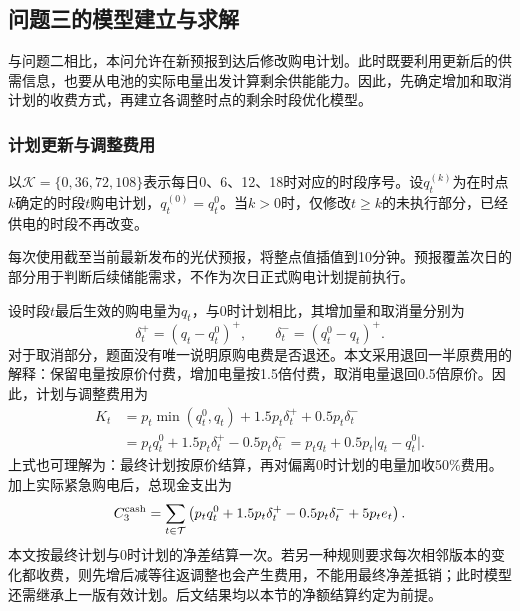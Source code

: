 

\subsection{问题三的模型建立与求解}
\label{sec:problem3}

与问题二相比，本问允许在新预报到达后修改购电计划。此时既要利用更新后的供需信息，也要从电池的实际电量出发计算剩余供能能力。因此，先确定增加和取消计划的收费方式，再建立各调整时点的剩余时段优化模型。

\subsubsection{计划更新与调整费用}

以$\mathcal K=\{0,36,72,108\}$表示每日0、6、12、18时对应的时段序号。设$q_t^{(k)}$为在时点$k$确定的时段$t$购电计划，$q_t^{(0)}=q_t^0$。当$k>0$时，仅修改$t\ge k$的未执行部分，已经供电的时段不再改变。

每次使用截至当前最新发布的光伏预报，将整点值插值到10分钟。预报覆盖次日的部分用于判断后续储能需求，不作为次日正式购电计划提前执行。

设时段$t$最后生效的购电量为$q_t$，与0时计划相比，其增加量和取消量分别为
\begin{equation}
  \delta_t^+=(q_t-q_t^0)^+,\qquad
  \delta_t^-=(q_t^0-q_t)^+.
  \label{eq:adjustment}
\end{equation}
对于取消部分，题面没有唯一说明原购电费是否退还。本文采用退回一半原费用的解释：保留电量按原价付费，增加电量按1.5倍付费，取消电量退回0.5倍原价。因此，计划与调整费用为
\begin{equation}
\begin{aligned}
  K_t&=p_t\min(q_t^0,q_t)+1.5p_t\delta_t^++0.5p_t\delta_t^-\\
     &=p_tq_t^0+1.5p_t\delta_t^+-0.5p_t\delta_t^-
      =p_tq_t+0.5p_t\lvert q_t-q_t^0\rvert.
\end{aligned}
  \label{eq:contract-cost}
\end{equation}
上式也可理解为：最终计划按原价结算，再对偏离0时计划的电量加收50\%费用。加上实际紧急购电后，总现金支出为
\begin{equation}
  C_3^{\rm cash}=\sum_{t\in\mathcal T}
  \left(p_tq_t^0+1.5p_t\delta_t^+-0.5p_t\delta_t^-+5p_te_t\right).
  \label{eq:problem3-cash}
\end{equation}
本文按最终计划与0时计划的净差结算一次。若另一种规则要求每次相邻版本的变化都收费，则先增后减等往返调整也会产生费用，不能用最终净差抵销；此时模型还需继承上一版有效计划。后文结果均以本节的净额结算约定为前提。

